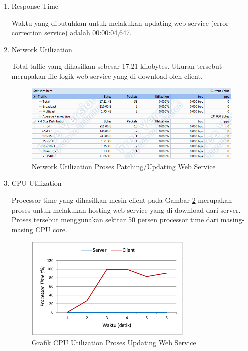 \begin{enumerate}
\begin{enumerate}
\item Response Time

Waktu yang dibutuhkan untuk melakukan updating web service (error correction service) adalah 00:00:04,647.
\item Network Utilization

Total taffic yang dihasilkan sebesar 17.21 kilobytes. Ukuran tersebut merupakan file logik web service yang di-download oleh client.

\begin{figure}[h]
    \centering
    \includegraphics[width=13cm]{../../Resources/Images/takdir-testing-3-network}
    \caption{Network Utilization Proses Patching/Updating Web Service}
    \label{fig:testing-3-network}
\end{figure}

\item CPU Utilization

Processor time yang dihasilkan mesin client pada Gambar \ref{fig:testing-3-cpu} merupakan proses untuk melakukan hosting web service yang di-download dari server. Proses tersebut menggunakan sekitar 50 persen processor time dari masing-masing CPU core.

\begin{figure}[h]
    \centering
    \includegraphics[width=8cm]{../../Resources/Images/takdir-testing-3-cpu}
    \caption{Grafik CPU Utilization Proses Updating Web Service}
    \label{fig:testing-3-cpu}
\end{figure}
\end{enumerate}
\end{enumerate}
